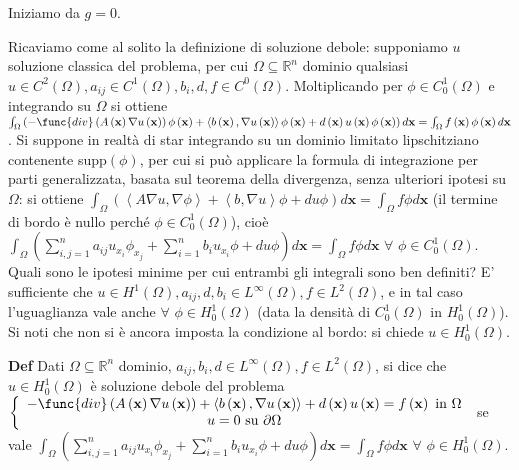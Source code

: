 \documentclass{article}
\begin{document}
Iniziamo da $g=0$.

Ricaviamo come al solito la definizione di soluzione debole: supponiamo $u$
soluzione classica del problema, per cui $\Omega \subseteq 
\mathbb{R}
^{n}$ dominio qualsiasi $u\in C^{2}\left( \Omega \right) ,a_{ij}\in
C^{1}\left( \Omega \right) ,b_{i},d,f\in C^{0}\left( \Omega \right) $.
Moltiplicando per $\phi \in C_{0}^{1}\left( \Omega \right) $ e integrando su 
$\Omega $ si ottiene $\int_{\Omega }\left( -\func{div}\left( A\left( \mathbf{%
x}\right) \nabla u\left( \mathbf{x}\right) \right) \phi \left( \mathbf{x}%
\right) +\left\langle b\left( \mathbf{x}\right) ,\nabla u\left( \mathbf{x}%
\right) \right\rangle \phi \left( \mathbf{x}\right) +d\left( \mathbf{x}%
\right) u\left( \mathbf{x}\right) \phi \left( \mathbf{x}\right) \right) d%
\mathbf{x}=\int_{\Omega }f\left( \mathbf{x}\right) \phi \left( \mathbf{x}%
\right) d\mathbf{x}$. Si suppone in realt\`{a} di star integrando su un
dominio limitato lipschitziano contenente supp$\left( \phi \right) $, per
cui si pu\`{o} applicare la formula di integrazione per parti generalizzata,
basata sul teorema della divergenza, senza ulteriori ipotesi su $\Omega $:
si ottiene $\int_{\Omega }\left( \left\langle A\nabla u,\nabla \phi
\right\rangle +\left\langle b,\nabla u\right\rangle \phi +du\phi \right) d%
\mathbf{x}=\int_{\Omega }f\phi d\mathbf{x}$ (il termine di bordo \`{e} nullo
perch\'{e} $\phi \in C_{0}^{1}\left( \Omega \right) $), cio\`{e} $%
\int_{\Omega }\left( \sum_{i,j=1}^{n}a_{ij}u_{x_{i}}\phi
_{x_{j}}+\sum_{i=1}^{n}b_{i}u_{x_{i}}\phi +du\phi \right) d\mathbf{x}%
=\int_{\Omega }f\phi d\mathbf{x}$ $\forall $ $\phi \in C_{0}^{1}\left(
\Omega \right) $. Quali sono le ipotesi minime per cui entrambi gli
integrali sono ben definiti? E' sufficiente che $u\in H^{1}\left( \Omega
\right) ,a_{ij},d,b_{i}\in L^{\infty }\left( \Omega \right) ,f\in
L^{2}\left( \Omega \right) $, e in tal caso l'uguaglianza vale anche $%
\forall $ $\phi \in H_{0}^{1}\left( \Omega \right) $ (data la densit\`{a} di 
$C_{0}^{1}\left( \Omega \right) $ in $H_{0}^{1}\left( \Omega \right) $). Si
noti che non si \`{e} ancora imposta la condizione al bordo: si chiede $u\in
H_{0}^{1}\left( \Omega \right) $.

\textbf{Def} Dati $\Omega \subseteq 
\mathbb{R}
^{n}$ dominio, $a_{ij},b_{i},d\in L^{\infty }\left( \Omega \right) ,f\in
L^{2}\left( \Omega \right) $, si dice che $u\in H_{0}^{1}\left( \Omega
\right) $ \`{e} soluzione debole del problema $\left\{ 
\begin{array}{c}
-\func{div}\left( A\left( \mathbf{x}\right) \nabla u\left( \mathbf{x}\right)
\right) +\left\langle b\left( \mathbf{x}\right) ,\nabla u\left( \mathbf{x}%
\right) \right\rangle +d\left( \mathbf{x}\right) u\left( \mathbf{x}\right)
=f\left( \mathbf{x}\right) \text{ in }\Omega \\ 
u=0\text{ su }\partial \Omega%
\end{array}%
\right. $ se vale $\int_{\Omega }\left( \sum_{i,j=1}^{n}a_{ij}u_{x_{i}}\phi
_{x_{j}}+\sum_{i=1}^{n}b_{i}u_{x_{i}}\phi +du\phi \right) d\mathbf{x}%
=\int_{\Omega }f\phi d\mathbf{x}$ $\forall $ $\phi \in H_{0}^{1}\left(
\Omega \right) $.
\end{document}
